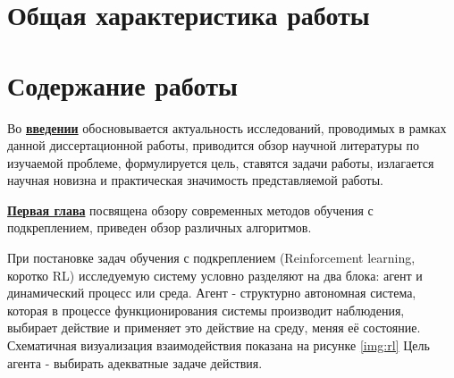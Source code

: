 
\section*{Общая характеристика работы}

\newcommand{\actuality}{\underline{\textbf{\actualityTXT}}}
\newcommand{\progress}{\underline{\textbf{\progressTXT}}}
\newcommand{\aim}{\underline{{\textbf\aimTXT}}}
\newcommand{\tasks}{\underline{\textbf{\tasksTXT}}}
\newcommand{\novelty}{\underline{\textbf{\noveltyTXT}}}
\newcommand{\influence}{\underline{\textbf{\influenceTXT}}}
\newcommand{\methods}{\underline{\textbf{\methodsTXT}}}
\newcommand{\defpositions}{\underline{\textbf{\defpositionsTXT}}}
\newcommand{\reliability}{\underline{\textbf{\reliabilityTXT}}}
\newcommand{\probation}{\underline{\textbf{\probationTXT}}}
\newcommand{\contribution}{\underline{\textbf{\contributionTXT}}}
\newcommand{\publications}{\underline{\textbf{\publicationsTXT}}}




\section*{Содержание работы}
Во \underline{\textbf{введении}} обосновывается актуальность
исследований, проводимых в рамках данной диссертационной работы,
приводится обзор научной литературы по изучаемой проблеме,
формулируется цель, ставятся задачи работы, излагается научная новизна
и практическая значимость представляемой работы.


\underline{\textbf{Первая глава}} посвящена обзору современных методов обучения с подкреплением, приведен обзор различных алгоритмов.

При постановке задач обучения с подкреплением (Reinforcement learning, коротко RL) исследуемую систему условно разделяют на два блока: агент и динамический процесс или среда. Агент - структурно автономная система, которая в процессе функционирования системы производит наблюдения, выбирает действие и применяет это действие на среду, меняя её состояние. Схематичная визуализация взаимодействия показана на рисунке \ref{img:rl} Цель агента - выбирать адекватные задаче действия.

